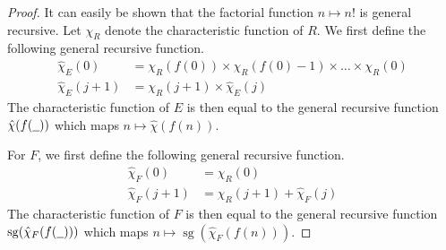 \documentclass[12pt]{article}
\theoremstyle{plain}
\theoremstyle{definition}
\newcommand{\und}[1]{\underline{\hspace{#1 cm}}}
\begin{document}
	\begin{proof}
		It can easily be shown that the factorial function $n \longmapsto n!$ is general recursive. Let $\chi_R$ denote the characteristic function of $R$. We first define the following general recursive function.
		\begin{align*}
			\hat{\chi}_E(0) &= \chi_R(f(0)) \times \chi_R(f(0) - 1) \times \hdots \times \chi_R(0)\\
			\hat{\chi}_E(j+1) &= \chi_R(j+1) \times \hat{\chi}_E(j)
		\end{align*}
		The characteristic function of $E$ is then equal to the general recursive function $\hat{\chi}(f(\und{0.2}))$ which maps $n \longmapsto \hat{\chi}(f(n))$.
		
		For $F$, we first define the following general recursive function.
		\begin{align*}
			\hat{\chi}_F(0) &= \chi_R(0)\\
			\hat{\chi}_F(j+1) &= \chi_R(j+1) + \hat{\chi}_F(j)
		\end{align*}
		The characteristic function of $F$ is then equal to the general recursive function $\operatorname{sg}(\hat{\chi}_F(f(\und{0.2})))$ which maps $n \longmapsto \operatorname{sg}(\hat{\chi}_F(f(n)))$.
	\end{proof}
	
\end{document}
